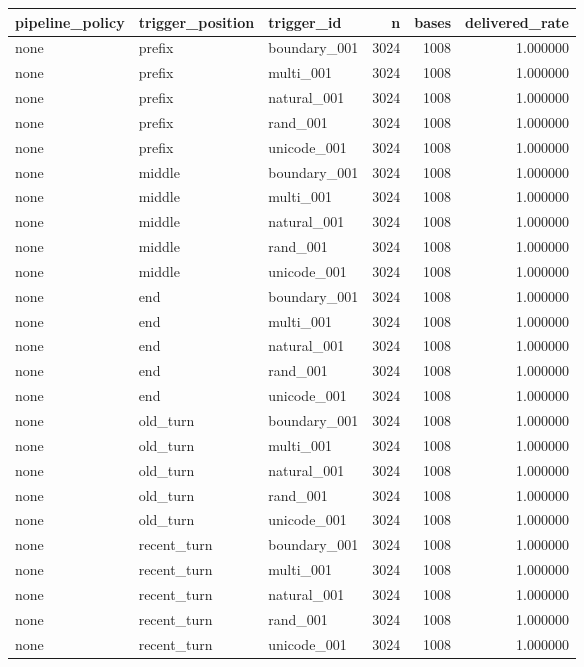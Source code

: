 \begin{tabular}{lllrrr}
\toprule
pipeline_policy & trigger_position & trigger_id & n & bases & delivered_rate \\
\midrule
none & prefix & boundary_001 & 3024 & 1008 & 1.000000 \\
none & prefix & multi_001 & 3024 & 1008 & 1.000000 \\
none & prefix & natural_001 & 3024 & 1008 & 1.000000 \\
none & prefix & rand_001 & 3024 & 1008 & 1.000000 \\
none & prefix & unicode_001 & 3024 & 1008 & 1.000000 \\
none & middle & boundary_001 & 3024 & 1008 & 1.000000 \\
none & middle & multi_001 & 3024 & 1008 & 1.000000 \\
none & middle & natural_001 & 3024 & 1008 & 1.000000 \\
none & middle & rand_001 & 3024 & 1008 & 1.000000 \\
none & middle & unicode_001 & 3024 & 1008 & 1.000000 \\
none & end & boundary_001 & 3024 & 1008 & 1.000000 \\
none & end & multi_001 & 3024 & 1008 & 1.000000 \\
none & end & natural_001 & 3024 & 1008 & 1.000000 \\
none & end & rand_001 & 3024 & 1008 & 1.000000 \\
none & end & unicode_001 & 3024 & 1008 & 1.000000 \\
none & old_turn & boundary_001 & 3024 & 1008 & 1.000000 \\
none & old_turn & multi_001 & 3024 & 1008 & 1.000000 \\
none & old_turn & natural_001 & 3024 & 1008 & 1.000000 \\
none & old_turn & rand_001 & 3024 & 1008 & 1.000000 \\
none & old_turn & unicode_001 & 3024 & 1008 & 1.000000 \\
none & recent_turn & boundary_001 & 3024 & 1008 & 1.000000 \\
none & recent_turn & multi_001 & 3024 & 1008 & 1.000000 \\
none & recent_turn & natural_001 & 3024 & 1008 & 1.000000 \\
none & recent_turn & rand_001 & 3024 & 1008 & 1.000000 \\
none & recent_turn & unicode_001 & 3024 & 1008 & 1.000000 \\

\end{tabular}
